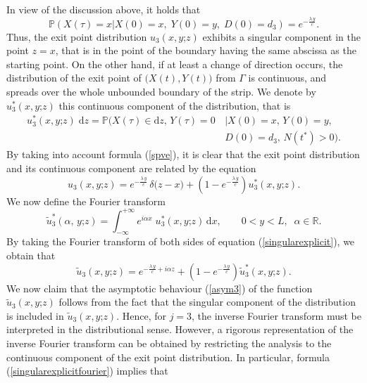 \documentclass{article}
\begin{document}
In view of the discussion above, it holds that \begin{equation}\mathbb{P}\left(X(\tau)=x\big\lvert X(0)=x,\; Y(0)=y,\;D(0)=d_3\right)=e^{-\frac{\lambda\,y}{c}}.\label{spve}\end{equation}
Thus, the exit point distribution $u_3(x,y\mathord{;}z)$ exhibits a singular component in the point $z=x$, that is in the point of the boundary having the same abscissa as the starting point. On the other hand, if at least a change of direction occurs, the distribution of the exit point of $\big(X(t),Y(t)\big)$ from $\Gamma$ is continuous, and spreads over the whole unbounded boundary of the strip. We denote by $u_3^*(x,y\mathord{;}z)$ this continuous component of the distribution, that is
\begin{align}u_3^*(x,y\mathord{;}z)\;\mathrm{d}z=\mathbb{P}\Big(X(\tau)\in\mathrm{d}z,\,Y(\tau)=0\,&\Big\lvert X(0)=x,\,Y(0)=y,\nonumber\\&D(0)=d_3,\,N(t^*)>0\Big).\nonumber\end{align}
By taking into account formula (\ref{spve}), it is clear that the exit point distribution and its continuous component are related by the equation
\begin{equation}u_3(x,y\mathord{;}z)=e^{-\frac{\lambda\,y}{c}}\,\delta\big(z-x\big)+\left(1-e^{-\frac{\lambda\,y}{c}}\right) u_3^*(x,y\mathord{;}z).\label{singularexplicit}\end{equation}
We now define the Fourier transform
$$\widetilde{u}_3^*(\alpha,\,y\mathord{;}z)=\int_{-\infty}^{+\infty}e^{i\alpha x}\;u_3^*(x,y\mathord{;}z)\,\mathrm{d}x,\qquad 0<y<L,\;\;\alpha\in\mathbb{R}.$$
By taking the Fourier transform of both sides of equation (\ref{singularexplicit}), we obtain that
\begin{equation}\widetilde{u}_3(x,y\mathord{;}z)=e^{-\frac{\lambda\,y}{c}+i\alpha z}+\left(1-e^{-\frac{\lambda\,y}{c}}\right) \widetilde{u}_3^*(x,y\mathord{;}z).\label{singularexplicitfourier}\end{equation}
We now claim that the asymptotic behaviour (\ref{asym3}) of the function $\widetilde{u}_3(x,y\mathord{;}z)$ follows from the fact that the singular component of the distribution is included in $\widetilde{u}_3(x,y\mathord{;}z)$. Hence, for $j=3$, the inverse Fourier transform must be interpreted in the distributional sense. However, a rigorous representation of the inverse Fourier transform can be obtained by restricting the analysis to the continuous component of the exit point distribution. In particular, formula (\ref{singularexplicitfourier}) implies that
\end{document}
